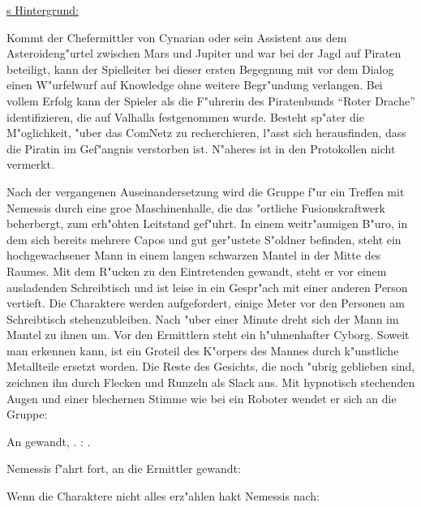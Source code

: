 \begin{remarks}
	\underline{\xl{}s Hintergrund:}

	Kommt der Chefermittler von Cynarian oder sein Assistent aus dem Asteroideng"urtel zwischen Mars und Jupiter und war bei der Jagd auf Piraten beteiligt, kann der Spielleiter bei dieser ersten Begegnung mit \xl{} vor dem Dialog einen W"urfelwurf auf Knowledge ohne weitere Begr"undung verlangen. Bei vollem Erfolg kann der Spieler \xl{} als die F"uhrerin des Piratenbunds ``Roter Drache'' identifizieren, die auf Valhalla festgenommen wurde. Besteht sp"ater die M"oglichkeit, "uber das ComNetz zu recherchieren, l"asst sich herausfinden, dass die Piratin im Gef"angnis verstorben ist. N"aheres ist in den Protokollen nicht vermerkt.
\end{remarks}



Nach der vergangenen Auseinandersetzung wird die Gruppe f"ur ein Treffen mit Nemessis durch eine gro\3e Maschinenhalle, die das "ortliche Fusionskraftwerk beherbergt, zum erh"ohten Leitstand gef"uhrt. In einem weitr"aumigen B"uro, in dem sich bereits mehrere Capos und gut ger"ustete S"oldner befinden, steht ein hochgewachsener Mann in einem langen schwarzen Mantel in der Mitte des Raumes. Mit dem R"ucken zu den Eintretenden gewandt, steht er vor einem ausladenden Schreibtisch und ist leise in ein Gespr"ach mit einer anderen Person vertieft. Die Charaktere werden aufgefordert, einige Meter vor den Personen am Schreibtisch stehenzubleiben. Nach "uber einer Minute dreht sich der Mann im Mantel zu ihnen um. Vor den Ermittlern steht ein h"uhnenhafter Cyborg. Soweit man erkennen kann, ist ein Gro\3teil des K"orpers des Mannes durch k"unstliche Metallteile ersetzt worden. Die Reste des Gesichts, die noch "ubrig geblieben sind, zeichnen ihn durch Flecken und Runzeln als Slack aus. Mit hypnotisch stechenden Augen und einer blechernen Stimme wie bei ein Roboter wendet er sich an die Gruppe:


An \xl{} gewandt, . \xl{}: . 

Nemessis f"ahrt fort, an die Ermittler gewandt:


Wenn die Charaktere nicht alles erz"ahlen hakt Nemessis nach:

